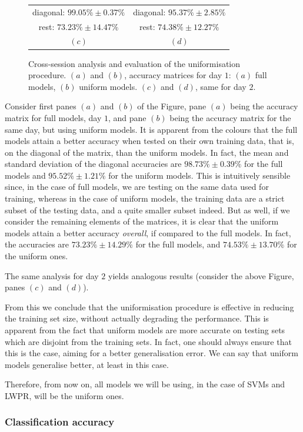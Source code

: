 \begin{figure}[!ht]
\begin{tabular}{cc}
    diagonal: $99.05\% \pm 0.37\%$ & diagonal: $95.37\% \pm 2.85\%$ \\
        rest: $73.23\% \pm 14.47\%$ & rest: $74.38\% \pm 12.27\%$ \\
    $(c)$ & $(d)$ \\
  \end{tabular}
  \caption{Cross-session analysis and evaluation of the uniformisation
    procedure. $(a)$ and $(b)$, accuracy matrices for day $1$: $(a)$
    full models, $(b)$ uniform models. $(c)$ and $(d)$, same for day $2$.}
  \label{fig:cross_initial}
\end{figure}

Consider first panes $(a)$ and $(b)$ of the Figure, pane $(a)$ being
the accuracy matrix for full models, day $1$, and pane $(b)$ being the
accuracy matrix for the same day, but using uniform models. It is
apparent from the colours that the full models attain a better
accuracy when tested on their own training data, that is, on the
diagonal of the matrix, than the uniform models. In fact, the mean and
standard deviation of the diagonal accuracies are $98.73\% \pm 0.39\%$
for the full models and $95.52\% \pm 1.21\%$ for the uniform
models. This is intuitively sensible since, in the case of full
models, we are testing on the same data used for training, whereas in
the case of uniform models, the training data are a strict subset of
the testing data, and a quite smaller subset indeed. But as well, if
we consider the remaining elements of the matrices, it is clear that
the uniform models attain a better accuracy \emph{overall}, if
compared to the full models. In fact, the accuracies are $73.23\% \pm
14.29\%$ for the full models, and $74.53\% \pm 13.70\%$ for the
uniform ones.

The same analysis for day $2$ yields analogous results (consider the
above Figure, panes $(c)$ and $(d)$).

From this we conclude that the uniformisation procedure is effective
in reducing the training set size, without actually degrading the
performance. This is apparent from the fact that uniform models are
more accurate on testing sets which are disjoint from the training
sets. In fact, one should always ensure that this is the case, aiming
for a better generalisation error. We can say that uniform models
generalise better, at least in this case.

Therefore, from now on, all models we will be using, in the case of
SVMs and LWPR, will be the uniform ones.

\subsubsection{Classification accuracy}


